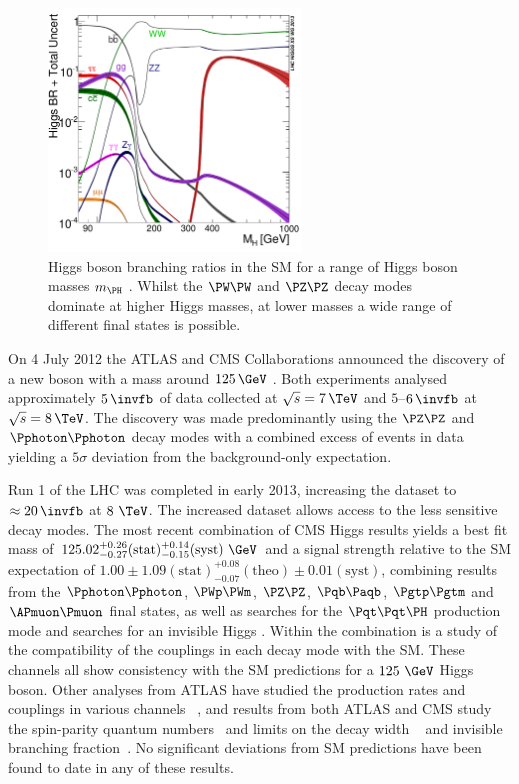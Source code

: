 \begin{figure}[htbp]
   \includegraphics[width=0.6\textwidth]{plots/theory/Higgs_BR.pdf}
\caption[Higgs boson branching ratios in the SM for a range of Higgs boson
masses.]{Higgs boson branching ratios in the SM for a range of Higgs boson
masses $m_{\PH}$ \cite{Heinemeyer:2013tqa}. Whilst the $\PW\PW$ and $\PZ\PZ$
decay modes dominate at higher Higgs masses, at lower masses a wide range of
different final states is possible.}
\label{fig:SMHiggsBRs}
\end{figure}

On 4 July 2012 the ATLAS and CMS Collaborations announced the discovery of a new
boson with a mass around $125\,\GeV$ \cite{CMSobservation125,ATLASobservation125}. 
Both experiments analysed approximately $5\,\invfb$ of data collected at 
$\sqrt{s}=7\,\TeV$ and $5$--$6\,\invfb$ at $\sqrt{s}=8\,\TeV$. The discovery was
made predominantly using the $\PZ\PZ$ and $\Pphoton\Pphoton$ decay modes with a
combined excess of events in data yielding a $5\sigma$ deviation from the
background-only expectation.

Run 1 of the LHC was completed in early 2013, increasing the dataset to
$\approx20\,\invfb$ at $8~\TeV$. The increased dataset allows access to the less
sensitive decay modes. The most recent combination of CMS Higgs results yields a
best fit mass of
$125.02^{+0.26}_{-0.27}(\text{stat})^{+0.14}_{-0.15}(\text{syst})~\GeV$ and a
signal strength relative to the \ac{SM} expectation of
$1.00\pm1.09(\text{stat})^{+0.08}_{-0.07}(\text{theo})\pm0.01(\text{syst})$,
combining results from the $\Pphoton\Pphoton$, $\PWp\PWm$, $\PZ\PZ$,
$\Pqb\Paqb$, $\Pgtp\Pgtm$ and $\APmuon\Pmuon$ final states, as well as 
searches for the $\Pqt\Pqt\PH$ production mode and searches for an invisible
Higgs \cite{CMScomb}. Within the combination is a study of the compatibility of
the couplings in each decay mode with the \ac{SM}. 
These channels all show consistency with the \ac{SM}
predictions for a $125~\GeV$ Higgs boson. Other analyses from ATLAS have
studied the production rates and couplings in various channels
~\cite{Aad:2014eva,Aad:2014lwa,Aad:2015vsa}, and results from both ATLAS and CMS study 
the spin-parity quantum
numbers~\cite{Chatrchyan:2013mxa,Chatrchyan:2013iaa,Aad:2013xqa} and limits on
the decay width ~\cite{Khachatryan:2014iha} and invisible branching
fraction~\cite{Aad:2014iia,Chatrchyan:2014tja}. No significant deviations from \ac{SM}
predictions have been found to date in any of these results.

